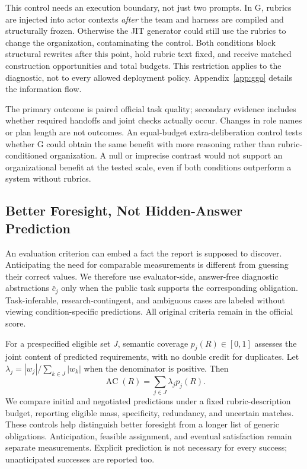 \documentclass[11pt]{article}
\begin{document}
This control needs an execution boundary, not just two prompts. In G, rubrics are injected into actor contexts \emph{after} the team and harness are compiled and structurally frozen. Otherwise the JIT generator could still use the rubrics to change the organization, contaminating the control. Both conditions block structural rewrites after this point, hold rubric text fixed, and receive matched construction opportunities and total budgets. This restriction applies to the diagnostic, not to every allowed deployment policy. Appendix~\ref{app:ggo} details the information flow.

The primary outcome is paired official task quality; secondary evidence includes whether required handoffs and joint checks actually occur. Changes in role names or plan length are not outcomes. An equal-budget extra-deliberation control tests whether G could obtain the same benefit with more reasoning rather than rubric-conditioned organization. A null or imprecise contrast would not support an organizational benefit at the tested scale, even if both conditions outperform a system without rubrics.

\subsection{Better Foresight, Not Hidden-Answer Prediction}
\label{sec:foresight}

An evaluation criterion can embed a fact the report is supposed to discover. Anticipating the need for comparable measurements is different from guessing their correct values. We therefore use evaluator-side, answer-free diagnostic abstractions $\bar c_j$ only when the public task supports the corresponding obligation. Task-inferable, research-contingent, and ambiguous cases are labeled without viewing condition-specific predictions. All original criteria remain in the official score.

For a prespecified eligible set $J$, semantic coverage $p_j(R)\in[0,1]$ assesses the joint content of predicted requirements, with no double credit for duplicates. Let $\lambda_j=|w_j|/\sum_{k\in J}|w_k|$ when the denominator is positive. Then
\begin{equation}
\operatorname{AC}(R)=\sum_{j\in J}\lambda_jp_j(R).
\end{equation}
We compare initial and negotiated predictions under a fixed rubric-description budget, reporting eligible mass, specificity, redundancy, and uncertain matches. These controls help distinguish better foresight from a longer list of generic obligations. Anticipation, feasible assignment, and eventual satisfaction remain separate measurements. Explicit prediction is not necessary for every success; unanticipated successes are reported too.
\end{document}
